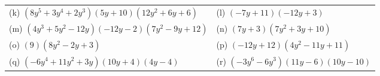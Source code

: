 \begin{enumerate}[noitemsep, label=\textbf{\arabic*}. ]
{\begin{tabular}[t]{|l|l|}
     \tabularnewline\cline{1-1}\cline{2-2}
        (k) $\left(8{y}^{5}+3{y}^{4}+2{y}^{3}\right)\left(5y+10\right)\left(12{y}^{2}+6y+6\right)$ &
        (l) $\left(-7y+11\right)\left(-12y+3\right)$%
     \tabularnewline\cline{1-1}\cline{2-2}
        (m) $\left(4{y}^{3}+5{y}^{2}-12y\right)\left(-12y-2\right)\left(7{y}^{2}-9y+12\right)$ &
        (n) $\left(7y+3\right)\left(7{y}^{2}+3y+10\right)$%
     \tabularnewline\cline{1-1}\cline{2-2}
        (o) $\left(9\right)\left(8{y}^{2}-2y+3\right)$ &
        (p) $\left(-12y+12\right)\left(4{y}^{2}-11y+11\right)$%
     \tabularnewline\cline{1-1}\cline{2-2}
        (q) $\left(-6{y}^{4}+11{y}^{2}+3y\right)\left(10y+4\right)\left(4y-4\right)$ &
        (r) $\left(-3{y}^{6}-6{y}^{3}\right)\left(11y-6\right)\left(10y-10\right)$%

\end{tabular}}
\end{enumerate}
